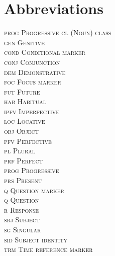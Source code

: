 \documentclass[output=paper,colorlinks,citecolor=brown]{langscibook}
\begin{document}
\section*{Abbreviations}
    \begin{multicols}{2}
	\begin{tabbing}
        \scshape prog \hspace{1ex} \= Progressive\kill
		\scshape cl \> (Noun) class\\
		\scshape gen \> Genitive\\
		\scshape cond \> Conditional marker\\
		\scshape conj \> Conjunction\\
		\scshape dem \> Demonstrative\\
		\scshape foc \> Focus marker\\
		\scshape fut \> Future\\
		\scshape hab \> Habitual\\
		\scshape ipfv \> Imperfective\\
		\scshape loc \> Locative\\
		\scshape obj \> Object\\
		\scshape pfv \> Perfective\\
		\scshape pl \> Plural\\
		\scshape prf \> Perfect\\
		\scshape prog \> Progressive\\
		\scshape prs \> Present\\
		\scshape q \> Question marker\\
		\scshape q \> Question\\
		\scshape r \> Response\\
		\scshape sbj \> Subject\\
		\scshape sg \> Singular\\
		\scshape sid \> Subject identity\\
		\scshape trm \> Time reference marker\\
	\end{tabbing}
    \end{multicols}

{\sloppy\printbibliography[heading=subbibliography,notkeyword=this]}
\end{document}
